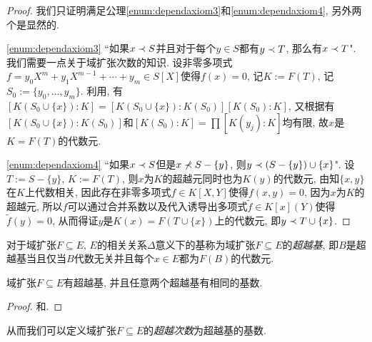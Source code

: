 \begin{proof}
    我们只证明满足公理\ref{enum:dependaxiom3}和\ref{enum:dependaxiom4}, 另外两个是显然的.

    \ref{enum:dependaxiom3} ``如果$x\prec S$并且对于每个$y\in S$都有$y\prec T$, 那么有$x\prec T$". 我们需要一点关于域扩张次数的知识. 设非零多项式$f=y_0X^m+ y_1X^{m-1}+ \dotsb + y_m\in S[X]$使得$f(x)=0$, 记$K:=F(T)$, 记$S_0:=\{y_0, \dotsc, y_m\}$. 利用, 有$[K(S_0\cup\{x\}):K]=[K(S_0\cup\{x\}):K(S_0)][K(S_0):K]$, 又根据有$[K(S_0\cup\{x\}):K(S_0)]$和$[K(S_0):K]=\prod [K(y_j):K]$均有限, 故$x$是$K=F(T)$的代数元.

    \ref{enum:dependaxiom4} ``如果$x\prec S$但是$x\nprec S-\{y\}$, 则$y\prec (S-\{y\})\cup\{x\}$". 设$T:=S-\{y\}$, $K:=F(T)$, 则$x$为$K$的超越元同时也为$K(y)$的代数元, 由知$\{x, y\}$在$K$上代数相关, 因此存在非零多项式$f\in K[X, Y]$使得$f(x, y)=0$, 因为$x$为$K$的超越元, 所以$f$可以通过合并系数以及代入诱导出多项式$\tilde{f}\in K[x](Y)$使得$\tilde{f}(y)=0$, 从而得证$y$是$K(x)=F(T\cup\{x\})$上的代数元, 即$y\prec T\cup \{x\}$.
\end{proof}

对于域扩张$F\subseteq E$, $E$的相关关系$\Delta$意义下的基称为域扩张$F\subseteq E$的\emph{超越基}, 即$B$是超越基当且仅当$B$代数无关并且每个$x\in E$都为$F(B)$的代数元.

\begin{theorem}\label{thm:tranbasis}
    域扩张$F\subseteq E$有超越基, 并且任意两个超越基有相同的基数.
\end{theorem}

\begin{proof}
    和.
\end{proof}

从而我们可以定义域扩张$F\subseteq E$的\emph{超越次数}为超越基的基数.

